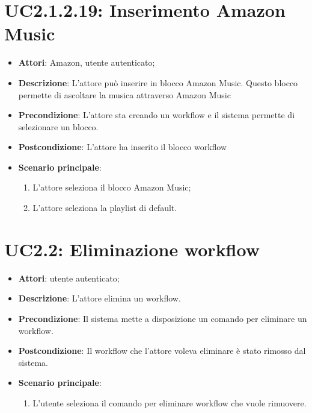 \section{UC2.1.2.19: Inserimento Amazon Music}
\label{UC2.1.2.19}
\begin{itemize}
	\item \textbf{Attori}: Amazon, utente autenticato;
	\item \textbf{Descrizione}: L'attore può inserire in blocco Amazon Music. Questo blocco permette di ascoltare la musica attraverso Amazon Music
	\item \textbf{Precondizione}: L'attore sta creando un workflow e il sistema permette di selezionare un blocco.	
	\item \textbf{Postcondizione}: L'attore ha inserito il blocco workflow
	\item \textbf{Scenario principale}:
	\begin{enumerate} \item L'attore seleziona il blocco Amazon Music;  \item  L'attore seleziona la playlist di default.\end{enumerate}
\end{itemize}

\section{UC2.2: Eliminazione workflow}
\label{UC2.2}
\begin{itemize}
	\item \textbf{Attori}: utente autenticato;
	\item \textbf{Descrizione}: L'attore elimina un workflow.
	\item \textbf{Precondizione}: Il sistema mette a disposizione un comando per eliminare un workflow.
	\item \textbf{Postcondizione}: Il workflow che l'attore voleva eliminare è stato rimosso dal sistema.
	\item \textbf{Scenario principale}:
	\begin{enumerate} \item L'utente seleziona il comando per eliminare workflow che vuole rimuovere.\end{enumerate}
\end{itemize}


